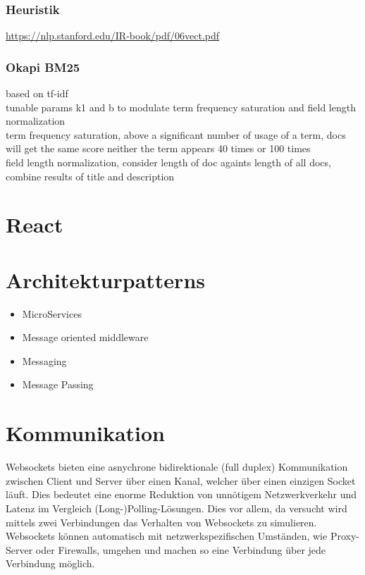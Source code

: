 \subsubsection{Heuristik}

\url{https://nlp.stanford.edu/IR-book/pdf/06vect.pdf}\\

\subsubsection{Okapi BM25}
based on tf-idf\\
tunable params k1 and b to modulate term frequency saturation and field length normalization\\
term frequency saturation, above a significant number of usage of a term, docs will get the same score neither the term appears 40 times or 100 times\\
field length normalization, consider length of doc againts length of all docs, combine results of title and description


\section{React}

\section{Architekturpatterns}

\begin{itemize}
    \item MicroServices
    \item Message oriented middleware
    \item Messaging
    \item Message Passing
\end{itemize}

\section{Kommunikation}\label{literatur-kommunikation} 
Websockets bieten eine asnychrone bidirektionale (full duplex) Kommunikation zwischen Client und Server über einen Kanal, welcher über einen einzigen Socket läuft. Dies bedeutet eine enorme Reduktion von unnötigem Netzwerkverkehr und Latenz im Vergleich (Long-)Polling-Lösungen. Dies vor allem, da versucht wird mittels zwei Verbindungen das Verhalten von Websockets zu simulieren. Websockets können automatisch mit netzwerkspezifischen Umständen, wie Proxy-Server oder Firewalls, umgehen und machen so eine Verbindung über jede Verbindung möglich.\\\cite{AboutHTM97:online}

